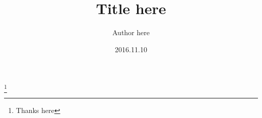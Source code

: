 \documentclass[aip,cha,10pt,a4paper,reprint,superscriptaddress]{revtex4-1}
\begin{document}
  \title{Title here}
  \author{Author here}
  \thanks{Thanks here}
  \date{2016.11.10}

  

  \maketitle

  
  
  
\end{document}
